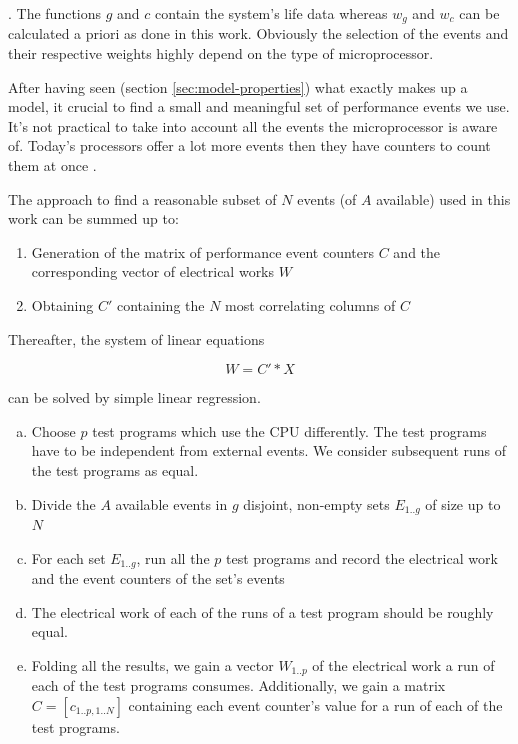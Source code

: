 . The functions $g$ and $c$ contain the system's life data whereas $w_g$ and
$w_c$ can be calculated a priori as done in this work. Obviously the selection
of the events and their respective weights highly depend on the type of
microprocessor.


\label{sec:min-events}

After having seen (section \ref{sec:model-properties}) what exactly makes up a
model, it crucial to find a small and meaningful set of performance events we
use. It's not practical to take into account all the events the
microprocessor is aware of. Today's processors offer a lot more events then they
have counters to count them at once \cite{intel2011softdev1}.

The approach to find a reasonable subset of $N$ events (of $A$ available) used
in this work can be summed up to:

\begin{enumerate}

\item Generation of the matrix of performance event counters $C$ and
the corresponding vector of electrical works $W$

\item Obtaining $C'$ containing the $N$ most correlating columns of $C$

\end{enumerate}

Thereafter, the system of linear equations

\begin{equation}
W = C' * X
\end{equation}

can be solved by simple linear regression.



\begin{enumerate}[(a)]

\item Choose $p$ test programs which use the CPU differently. The test
programs have to be independent from external events. We consider subsequent
runs of the test programs as equal.

\item Divide the $A$ available events in $g$ disjoint, non-empty sets $E_{1..g}$
of size up to $N$

\item For each set $E_{1..g}$, run all the $p$ test programs and record the
electrical work and the event counters of the set's events

\item The electrical work of each of the runs of a test program should be
roughly equal.

\item Folding all the results, we gain a vector $W_{1..p}$ of the electrical
work a run of each of the test programs consumes. Additionally, we gain a matrix
$C = [c_{1..p,1..N}]$ containing each event counter's value for a run of each of
the test programs.

\end{enumerate}

